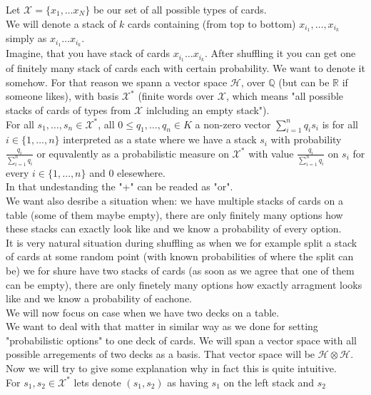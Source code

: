 \documentclass[a4paper, 12pt]{report}
\begin{document}
Let $\mathcal{X} = \{x_1, \dots x_N\}$ be our set of all possible types of cards. \\
We will denote a stack of $k$ cards containing (from top to bottom) $x_{i_1}, \dots, x_{i_k}$ simply as 
$x_{i_1}\dots x_{i_k}$. \\
Imagine, that you have stack of cards $x_{i_1}\dots x_{i_k}$. After shuffling it
you can get one of finitely many stack of cards each with certain probability. We want to denote it somehow. 
For that reason we spann a vector space $\mathcal{H}$, over $\mathbb{Q}$ (but can be $\mathbb{R}$ if someone 
likes), 
with basis $\mathcal{X}^*$ (finite words over $\mathcal{X}$, which means "all possible stacks 
of cards of types from $\mathcal{X}$ inlcluding an empty stack"). \\
For all $s_1, \dots, s_n \in \mathcal{X}^*$, all $0 \leq q_1, \dots, q_n \in K$ a non-zero vector 
$\displaystyle\sum^{n}_{i = 1} q_is_i$ is for all $i \in \{1, \dots, n\}$ 
interpreted as a state where we have a stack $s_i$ with probability $\frac{q_i}{\sum^n_{i=1} q_i}$ or 
equvalently as a probabilistic measure on $\mathcal{X}^*$ with value $\frac{q_i}{\sum^n_{i=1} q_i}$ on $s_i$ 
for every $i \in \{1, \dots, n\}$ and $0$ elesewhere. \\
In that undestanding the "+" can be readed as "or". \\
We want also desribe a situation when: we have multiple stacks of cards on a table (some of them maybe 
empty), there are only finitely many options how 
these stacks can exactly look like and we know a probability of every option.\\ 
It is very natural situation during shuffling as when we for example split a stack of cards at some 
random point (with known probabilities of where the split can be) 
we for shure have two stacks of cards (as soon as we agree that one of them can be empty), 
there are only finetely many options how exactly arragment looks like and we know a probability of eachone. 
\\ We will now focus on case when we have two decks on a table. \\
We want to deal with that matter in similar way as we done for setting "probabilistic options" to one deck 
of cards. We will span a vector space with all possible arregements of two decks as a basis. 
That vector space will be $\mathcal{H} \otimes \mathcal{H}$. Now we will try to give some explanation why in 
fact this is quite intuitive.  \\
For $s_1, s_2 \in \mathcal{X}^*$ lets denote $(s_1, s_2)$ as having $s_1$ on the left stack and $s_2$ 
\end{document}

